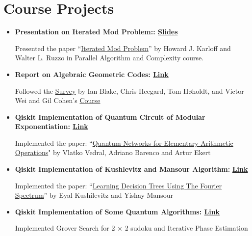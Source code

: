 \documentclass[10pt,a4paper,sans,colorlinks]{moderncv}        %
\begin{document}
\section{Course Projects}
\begin{itemize}
	\item \textbf{Presentation on Iterated Mod Problem:: \href{https://sohamch08.github.io/files/parallel-presentation-iterated-mod.pdf}{Slides}}
	
	\hfill  Presented the paper ``\href{https://www.sciencedirect.com/science/article/pii/0890540189900084}{Iterated Mod Problem}” by Howard J. Karloff and Walter L. Ruzzo in Parallel 	Algorithm and Complexity course.
	\item \textbf{Report on Algebraic Geometric Codes: \href{https://sohamch08.github.io//files/act-report.pdf}{Link}}
	
	\hfill Followed the \href{https://dl.acm.org/doi/abs/10.5555/334156.334207}{Survey} by Ian Blake, Chris Heegard, Tom Høholdt, and Victor Wei and Gil Cohen's \href{https://www.gilcohen.org/2022-ag-codes}{Course} 
	\item \textbf{Qiskit Implementation of Quantum Circuit of Modular Exponentiation: \href{https://github.com/bluecheese123/-Best_Project-}{Link}}
	
	\hfill Implemented the paper: ``\href{https://arxiv.org/pdf/quant-ph/9511018.pdf}{Quantum Networks for Elementary Arithmetic Operations}" by Vlatko Vedral, Adriano Barenco and Artur Ekert 
	
	\item \textbf{Qiskit Implementation of Kushlevitz and Mansour Algorithm:} \href{https://github.com/sohamch08/Qiskit-Quantum-Algo/blob/master/Kushlevitz%20and%20Mansour%20Algorithm.ipynb}{\textbf{Link}}
	
	\hfill Implemented the paper: ``\href{https://dl.acm.org/doi/pdf/10.1145/103418.103466}{Learning Decision Trees Using The Fourier Spectrum}” by Eyal Kushilevitz and Yishay Mansour
	
	\item \textbf{Qiskit Implementation of Some Quantum Algorithms: \href{https://github.com/sohamch08/Qiskit-Quantum-Algo}{Link}}
	
	\hfill Implemented Grover Search for 2 × 2 sudoku and Iterative Phase Estimation
\end{itemize}
\end{document}
